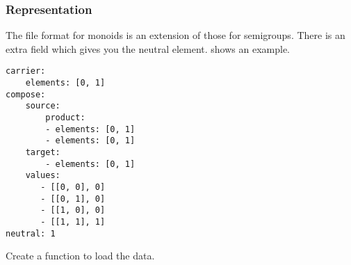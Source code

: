 





\subsubsection*{Representation}
%

The file format for monoids is an extension of those for semigroups.
There is an extra field  which gives you the neutral element.
 shows an example.

\begin{longcode}
  \caption{}
  \label{lst:monoid1}
  \begin{verbatim}
carrier:
    elements: [0, 1]
compose:
    source:
        product:
        - elements: [0, 1]
        - elements: [0, 1]
    target:
        - elements: [0, 1]
    values:
       - [[0, 0], 0]
       - [[0, 1], 0]
       - [[1, 0], 0]
       - [[1, 1], 1]
neutral: 1
  \end{verbatim}
\end{longcode}



\begin{codeexercise}
  Create a function to load the data.
%
\end{codeexercise}


